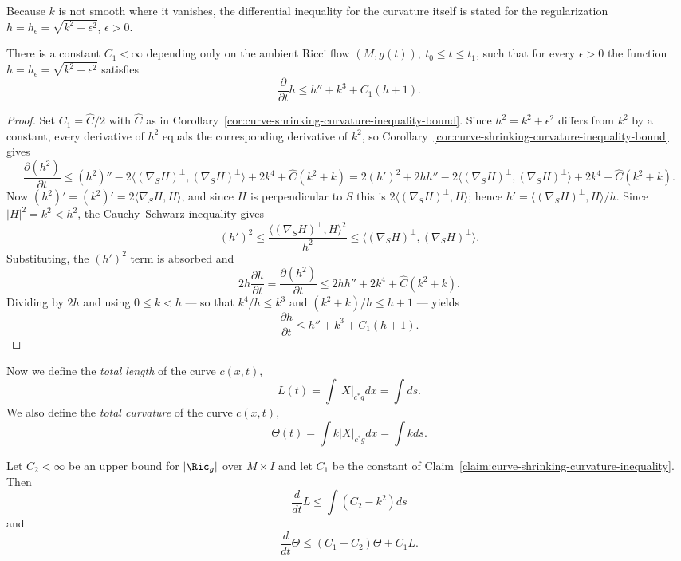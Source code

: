 Because $k$ is not smooth where it vanishes, the differential inequality for the
curvature itself is stated for the regularization
$h=h_\epsilon=\sqrt{k^2+\epsilon^2}$, $\epsilon>0$.

\begin{claim}
\label{claim:curve-shrinking-curvature-inequality}
\label{3rdcurvshr}
 There is a constant $C_1<\infty$ depending only on the ambient Ricci flow
$(M,g(t)),\ t_0\le t\le t_1$, such that for every $\epsilon>0$ the function
$h=h_\epsilon=\sqrt{k^2+\epsilon^2}$ satisfies
$$\frac{\partial}{\partial t} h\le h''+k^3+C_1(h+1).$$
\end{claim}

\begin{proof}
Set $C_1=\widehat C/2$ with $\widehat C$ as in
Corollary~\ref{cor:curve-shrinking-curvature-inequality-bound}. Since
$h^2=k^2+\epsilon^2$ differs from $k^2$ by a constant, every derivative of $h^2$
equals the corresponding derivative of $k^2$, so
Corollary~\ref{cor:curve-shrinking-curvature-inequality-bound} gives
$$\frac{\partial (h^2)}{\partial t}\le (h^2)''-2\langle(\nabla_SH)^\perp,(\nabla_SH)^\perp\rangle+2k^4+\widehat C(k^2+k)
= 2(h')^2+2hh''-2\langle(\nabla_SH)^\perp,(\nabla_SH)^\perp\rangle+2k^4+\widehat C(k^2+k).$$
Now $(h^2)'=(k^2)'=2\langle\nabla_SH,H\rangle$, and since $H$ is perpendicular
to $S$ this is $2\langle(\nabla_SH)^\perp,H\rangle$; hence
$h'=\langle(\nabla_SH)^\perp,H\rangle/h$. Since $|H|^2=k^2<h^2$, the
Cauchy--Schwarz inequality gives
$$(h')^2\le\frac{\langle(\nabla_SH)^\perp,H\rangle^2}{h^2}\le\langle(\nabla_SH)^\perp,(\nabla_SH)^\perp\rangle.$$
Substituting, the $(h')^2$ term is absorbed and
$$2h\frac{\partial h}{\partial t}=\frac{\partial (h^2)}{\partial t}\le 2hh''+2k^4+\widehat C(k^2+k).$$
Dividing by $2h$ and using $0\le k<h$ — so that $k^4/h\le k^3$ and
$(k^2+k)/h\le h+1$ — yields
$$\frac{\partial h}{\partial t}\le h''+k^3+C_1(h+1).$$
\end{proof}

Now we define the {\em total length} of the curve $c(x,t)$,
$$L(t)=\int |X|_{c^*g}dx=\int ds.$$
 We also define the {\em total curvature} of the curve $c(x,t)$,
$$\Theta(t)=\int k|X|_{c^*g}dx=\int kds.$$


\begin{lemma}
\label{lem:curve-shrinking-length-curvature-growth}
\label{1835}
Let $C_2<\infty$ be an upper bound for $|\Ric_g|$ over $M\times I$ and let $C_1$
be the constant of Claim~\ref{claim:curve-shrinking-curvature-inequality}. Then
\begin{equation}\label{Lformula}
\frac{d}{dt}L\le \int (C_2-k^2)ds\end{equation} and
$$\frac{d}{dt}\Theta\le (C_1+C_2)\Theta+C_1L.$$
\end{lemma}

